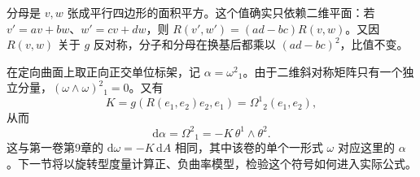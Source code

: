 分母是 \(v,w\) 张成平行四边形的面积平方。这个值确实只依赖二维平面：若 \(v'=av+bw\)、\(w'=cv+dw\)，则 \(R(v',w')=(ad-bc)R(v,w)\)。又因 \(R(v,w)\) 关于 \(g\) 反对称，分子和分母在换基后都乘以 \((ad-bc)^2\)，比值不变。

\ProseParagraphBreak

在定向曲面上取正向正交单位标架，记 \(\alpha=\omega^2{}_1\)。由于二维斜对称矩阵只有一个独立分量，\((\omega\wedge\omega)^2{}_1=0\)。又有
\[
	K=g(R(e_1,e_2)e_2,e_1)=\Omega^1{}_2(e_1,e_2),
\]
从而
\begin{equation}\label{g3:eq:surface-curvature-form}
	\mathrm{d}\alpha=\Omega^2{}_1=-K\,\theta^1\wedge\theta^2.
\end{equation}
这与第一卷第9章的 \(\mathrm{d}\omega=-K\,\mathrm{d}A\) 相同，其中该卷的单个一形式 \(\omega\) 对应这里的 \(\alpha\)。下一节将以旋转型度量计算正、负曲率模型，检验这个符号如何进入实际公式。
